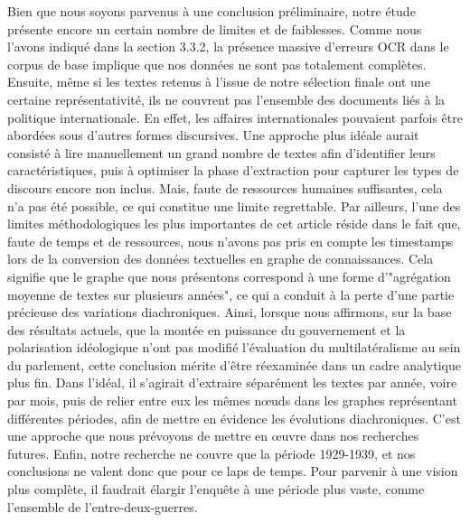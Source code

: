 \documentclass[a4paper,twoside,12pt]{book}
\begin{document}
Bien que nous soyons parvenus à une conclusion préliminaire, notre étude présente encore un certain nombre de limites et de faiblesses. Comme nous l'avons indiqué dans la section 3.3.2, la présence massive d'erreurs OCR dans le corpus de base implique que nos données ne sont pas totalement complètes. Ensuite, même si les textes retenus à l'issue de notre sélection finale ont une certaine représentativité, ils ne couvrent pas l'ensemble des documents liés à la politique internationale. En effet, les affaires internationales pouvaient parfois être abordées sous d'autres formes discursives. Une approche plus idéale aurait consisté à lire manuellement un grand nombre de textes afin d'identifier leurs caractéristiques, puis à optimiser la phase d'extraction pour capturer les types de discours encore non inclus. Mais, faute de ressources humaines suffisantes, cela n'a pas été possible, ce qui constitue une limite regrettable. Par ailleurs, l'une des limites méthodologiques les plus importantes de cet article réside dans le fait que, faute de temps et de ressources, nous n'avons pas pris en compte les timestamps lors de la conversion des données textuelles en graphe de connaissances. Cela signifie que le graphe que nous présentons correspond à une forme d'"agrégation moyenne de textes sur plusieurs années", ce qui a conduit à la perte d'une partie précieuse des variations diachroniques. Ainsi, lorsque nous affirmons, sur la base des résultats actuels, que la montée en puissance du gouvernement et la polarisation idéologique n'ont pas modifié l'évaluation du multilatéralisme au sein du parlement, cette conclusion mérite d'être réexaminée dans un cadre analytique plus fin. Dans l'idéal, il s'agirait d'extraire séparément les textes par année, voire par mois, puis de relier entre eux les mêmes nœuds dans les graphes représentant différentes périodes, afin de mettre en évidence les évolutions diachroniques. C'est une approche que nous prévoyons de mettre en œuvre dans nos recherches futures. Enfin, notre recherche ne couvre que la période 1929-1939, et nos conclusions ne valent donc que pour ce laps de temps. Pour parvenir à une vision plus complète, il faudrait élargir l'enquête à une période plus vaste, comme l'ensemble de l'entre-deux-guerres.
\end{document}
